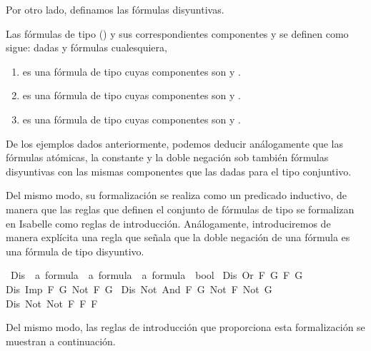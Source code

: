 \begin{isabellebody}
\begin{isamarkuptext}
  Por otro lado, definamos las fórmulas disyuntivas.

  \begin{definicion}
    Las fórmulas de tipo \isa{{\isasymbeta}} () y sus correspondientes componentes
     y  se definen como sigue: dadas  y  fórmulas cualesquiera,
    \begin{enumerate}
      \item {} es una fórmula de tipo \isa{{\isasymbeta}} cuyas componentes son  y .
      \item {} es una fórmula de tipo \isa{{\isasymbeta}} cuyas componentes son  y .
      \item {} es una fórmula de tipo \isa{{\isasymbeta}} cuyas componentes son  y .
    \end{enumerate} 
  \end{definicion}

  De los ejemplos dados anteriormente, podemos deducir análogamente que las fórmulas atómicas, la
  constante \isa{{\isasymbottom}} y la doble negación sob también fórmulas disyuntivas con las mismas componentes que
  las dadas para el tipo conjuntivo.

  Del mismo modo, su formalización se realiza como un predicado inductivo, de manera que las reglas 
  que definen el conjunto de fórmulas de tipo \isa{{\isasymbeta}} se formalizan en Isabelle como reglas de 
  introducción. Análogamente, introduciremos de manera explícita una regla que señala que la doble 
  negación de una fórmula es una fórmula de tipo disyuntivo.%
\end{isamarkuptext}\isamarkuptrue%
\isamarkupfalse%
\ Dis\ {\isacharcolon}{\isacharcolon}\ {\isachardoublequoteopen}{\isacharprime}a\ formula\ {\isacharequal}{\isachargreater}\ {\isacharprime}a\ formula\ {\isacharequal}{\isachargreater}\ {\isacharprime}a\ formula\ {\isacharequal}{\isachargreater}\ bool{\isachardoublequoteclose}\ \isanewline
{\isachardoublequoteopen}Dis\ {\isacharparenleft}Or\ F\ G{\isacharparenright}\ F\ G{\isachardoublequoteclose}\ {\isacharbar}\isanewline
{\isachardoublequoteopen}Dis\ {\isacharparenleft}Imp\ F\ G{\isacharparenright}\ {\isacharparenleft}Not\ F{\isacharparenright}\ G{\isachardoublequoteclose}\ {\isacharbar}\isanewline
{\isachardoublequoteopen}Dis\ {\isacharparenleft}Not\ {\isacharparenleft}And\ F\ G{\isacharparenright}{\isacharparenright}\ {\isacharparenleft}Not\ F{\isacharparenright}\ {\isacharparenleft}Not\ G{\isacharparenright}{\isachardoublequoteclose}\ {\isacharbar}\isanewline
{\isachardoublequoteopen}Dis\ {\isacharparenleft}Not\ {\isacharparenleft}Not\ F{\isacharparenright}{\isacharparenright}\ F\ F{\isachardoublequoteclose}%
\begin{isamarkuptext}%
Del mismo modo, las reglas de introducción que proporciona esta formalización se muestran a 
  continuación.


\end{isamarkuptext}
\end{isabellebody}
